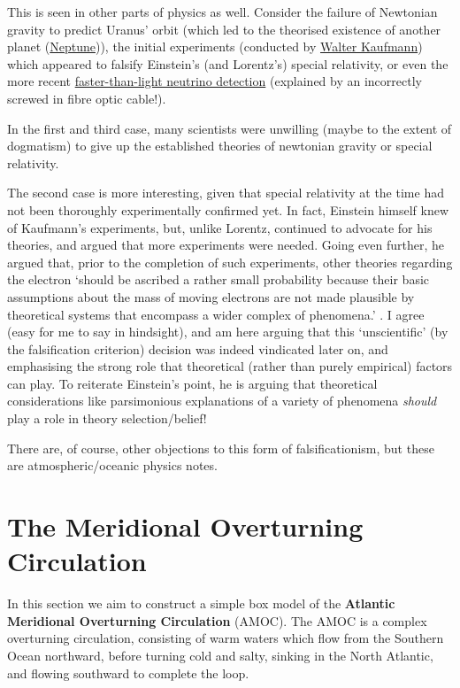 {    This is seen in other parts of physics as well. Consider the failure of Newtonian gravity to predict Uranus' orbit (which led to the theorised existence of another planet (\href{https://en.wikipedia.org/wiki/Neptune}{Neptune})), the initial experiments (conducted by \href{https://en.wikipedia.org/wiki/Walter_Kaufmann_(physicist)}{Walter Kaufmann}) which appeared to falsify Einstein's (and Lorentz's) special relativity, or even the more recent \href{https://en.wikipedia.org/wiki/2011_OPERA_faster-than-light_neutrino_anomaly}{faster-than-light neutrino detection} (explained by an incorrectly screwed in fibre optic cable!). 

    In the first and third case, many scientists were unwilling (maybe to the extent of dogmatism) to give up the established theories of newtonian gravity or special relativity.
    
    The second case is more interesting, given that special relativity at the time had not been thoroughly experimentally confirmed yet. In fact, Einstein himself knew of Kaufmann's experiments, but, unlike Lorentz, continued to advocate for his theories, and argued that more experiments were needed. Going even further, he argued that, prior to the completion of such experiments, other theories regarding the electron `should be ascribed a rather small probability because their basic assumptions about the mass of moving electrons are not made plausible by theoretical systems that encompass a wider complex of phenomena.' \cite{Histories_of_Relativity}. I agree (easy for me to say in hindsight), and am here arguing that this `unscientific' (by the falsification criterion) decision was indeed vindicated later on, and emphasising the strong role that theoretical (rather than purely empirical) factors can play. To reiterate Einstein's point, he is arguing that theoretical considerations like parsimonious explanations of a variety of phenomena \textit{should} play a role in theory selection/belief! 

    There are, of course, other objections to this form of falsificationism, but these are atmospheric/oceanic physics notes.
}

\section{The Meridional Overturning Circulation}\label{MOC}

In this section we aim to construct a simple box model of the \textbf{Atlantic Meridional Overturning Circulation} (AMOC). The AMOC is a complex overturning circulation, consisting of warm waters which flow from the Southern Ocean northward, before turning cold and salty, sinking in the North Atlantic, and flowing southward to complete the loop.



